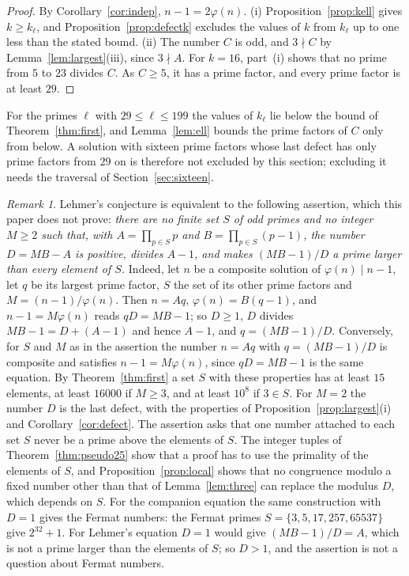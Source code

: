 \documentclass[11pt,reqno]{amsart}
\numberwithin{equation}{section}
\theoremstyle{plain}
\theoremstyle{definition}
\theoremstyle{remark}
\newtheorem{remark}[theorem]{Remark}
\begin{document}
\begin{proof}
By Corollary~\ref{cor:indep}, $n-1=2\varphi(n)$. (i) Proposition~\ref{prop:kell} gives $k\ge k_\ell$, and
Proposition~\ref{prop:defectk} excludes the values of $k$ from $k_\ell$
up to one less than the stated bound. (ii) The number $C$ is odd, and
$3\nmid C$ by Lemma~\ref{lem:largest}(iii), since $3\nmid A$. For
$k=16$, part~(i) shows that no prime from $5$ to $23$ divides $C$. As
$C\ge5$, it has a prime factor, and every prime factor is at least
$29$.
\end{proof}

For the primes $\ell$ with $29\le\ell\le199$ the values of $k_\ell$ lie
below the bound of Theorem~\ref{thm:first}, and Lemma~\ref{lem:ell}
bounds the prime factors of $C$ only from below. A solution with
sixteen prime factors whose last defect has only prime factors from
$29$ on is therefore not excluded by this section; excluding it needs
the traversal of Section~\ref{sec:sixteen}.

\begin{remark}\label{rem:open}
Lehmer's conjecture is equivalent to the following assertion, which
this paper does not prove: \emph{there are no finite set $S$ of odd
primes and no integer $M\ge2$ such that, with $A=\prod_{p\in S}p$ and
$B=\prod_{p\in S}(p-1)$, the number $D=MB-A$ is positive, divides
$A-1$, and makes $(MB-1)/D$ a prime larger than every element of $S$.}
Indeed, let $n$ be a composite solution of $\varphi(n)\mid n-1$, let
$q$ be its largest prime factor, $S$ the set of its other prime factors
and $M=(n-1)/\varphi(n)$. Then $n=Aq$, $\varphi(n)=B(q-1)$, and
$n-1=M\varphi(n)$ reads $qD=MB-1$; so $D\ge1$, $D$ divides
$MB-1=D+(A-1)$ and hence $A-1$, and $q=(MB-1)/D$. Conversely, for $S$
and $M$ as in the assertion the number $n=Aq$ with $q=(MB-1)/D$ is
composite and satisfies $n-1=M\varphi(n)$, since $qD=MB-1$ is the same
equation. By Theorem~\ref{thm:first} a set $S$ with these properties
has at least $15$ elements, at least $16000$ if $M\ge3$, and at least
$10^8$ if $3\in S$. For $M=2$ the number $D$ is the last defect, with
the properties of Proposition~\ref{prop:largest}(i) and
Corollary~\ref{cor:defect}. The assertion asks that one number attached
to each set $S$ never be a prime above the elements of $S$. The
integer tuples of Theorem~\ref{thm:pseudo25} show that a proof has to
use the primality of the elements of $S$, and
Proposition~\ref{prop:local} shows that no congruence modulo a fixed
number other than that of Lemma~\ref{lem:three} can replace the
modulus $D$, which depends on $S$. For the companion equation the same
construction with $D=1$ gives the Fermat numbers: the Fermat primes
$S=\{3,5,17,257,65537\}$ give $2^{32}+1$. For Lehmer's equation $D=1$
would give $(MB-1)/D=A$, which is not a prime larger than the elements
of $S$; so $D>1$, and the assertion is not a question about Fermat
numbers.
\end{remark}
\end{document}
